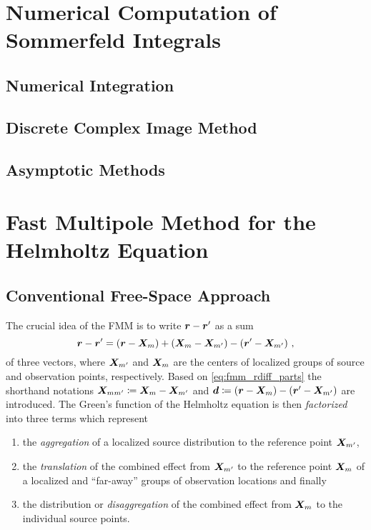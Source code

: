 \chapter{Numerical Computation of Sommerfeld Integrals}

\section{Numerical Integration}

\section{Discrete Complex Image Method}

\section{Asymptotic Methods}







\chapter{Fast Multipole Method for the Helmholtz Equation}

\section{Conventional Free-Space Approach}

The crucial idea of the \ac{FMM} is to write $\rdiff$ as a sum
\begin{equation}\label{eq:fmm_rdiff_parts}
	\rdiff =
	\left( \robs - \fmmObsGroupCenter              \right) +
	\left( \fmmObsGroupCenter - \fmmSrcGroupCenter \right) -
	\left( \rsrc - \fmmSrcGroupCenter              \right) \, ,
\end{equation}
of three vectors, where $\fmmSrcGroupCenter$ and $\fmmObsGroupCenter$ are the
centers of localized groups of source and observation points, respectively.
Based on \eqref{eq:fmm_rdiff_parts} the shorthand notations 
$\fmmDiffGroupCenters \coloneqq \fmmObsGroupCenter - \fmmSrcGroupCenter$
and 
$\pvec{d} \coloneqq \left( \robs - \fmmObsGroupCenter \right) - \left( \rsrc - \fmmSrcGroupCenter \right)$
are introduced.
The Green's function of the Helmholtz equation is then \emph{factorized} into
three terms which represent
\begin{enumerate}
	\item the \emph{aggregation} of a localized source distribution to the
	reference point $\fmmSrcGroupCenter$, 
	\item the \emph{translation} of the combined effect from
	$\fmmSrcGroupCenter$ to the reference point $\fmmObsGroupCenter$ of a
	localized and \enquote{far-away} groups of observation locations
	and finally
	\item the distribution or \emph{disaggregation} of the combined effect from
	$\fmmObsGroupCenter$ to the individual source points.
\end{enumerate}

